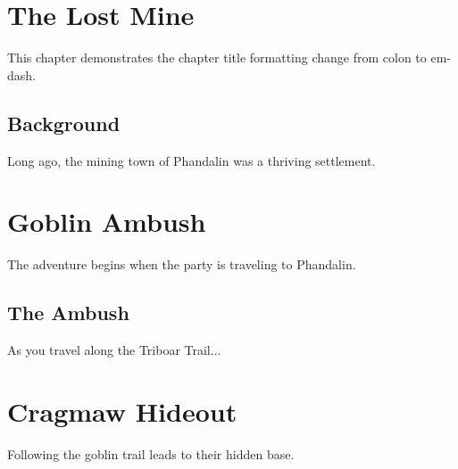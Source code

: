 \documentclass[fonts=wotc, bg=none, nooutline, letterpaper,twocolumn]{dndbook}
\begin{document}
\chapter{The Lost Mine}

This chapter demonstrates the chapter title formatting change from colon to em-dash.

\section{Background}

Long ago, the mining town of Phandalin was a thriving settlement.

\chapter{Goblin Ambush}

The adventure begins when the party is traveling to Phandalin.

\section{The Ambush}

As you travel along the Triboar Trail...

\chapter{Cragmaw Hideout}

Following the goblin trail leads to their hidden base.
\end{document}
